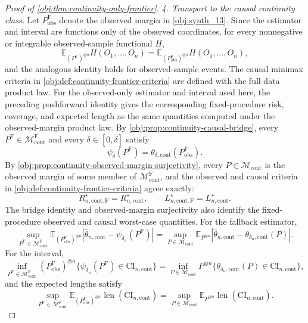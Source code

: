 \begin{proof}[Proof of \cref{obj:thm:continuity-only-frontier}]
\emph{4. Transport to the causal continuity class.}
Let \(P^{\mathrm F}_{\mathrm{obs}}\) denote the observed margin in \cref{obj:synth_13}.  Since the estimator and interval are functions only of the observed coordinates,
for every nonnegative or integrable observed-sample functional \(H\),
\[
\mathbb E_{(P^{\mathrm F})^{\otimes n}}H(O_1,\ldots,O_n)
=
\mathbb E_{(P^{\mathrm F}_{\mathrm{obs}})^{\otimes n}}H(O_1,\ldots,O_n),
\]
and the analogous identity holds for observed-sample events.  The causal minimax criteria in
\cref{obj:def:continuity-frontier-criteria} are defined with the full-data product law.  For the observed-only estimator and interval used here, the preceding pushforward identity gives the corresponding fixed-procedure risk, coverage, and expected length as the same quantities computed under the observed-margin product law.  By \cref{obj:prop:continuity-causal-bridge}, every
\(P^{\mathrm F}\in\mathcal M_{\mathrm{cont}}^{\mathrm F}\) and every
\(\delta\in[0,\bar\delta]\) satisfy
\[
\psi_\delta(P^{\mathrm F})
=
\theta_{\delta,\mathrm{cont}}(P^{\mathrm F}_{\mathrm{obs}}).
\]
By \cref{obj:prop:continuity-observed-margin-surjectivity}, every
\(P\in\mathcal M_{\mathrm{cont}}\) is the observed margin of some member of
\(\mathcal M_{\mathrm{cont}}^{\mathrm F}\), and the observed and causal criteria in
\cref{obj:def:continuity-frontier-criteria} agree exactly:
\[
R_{n,\mathrm{cont},\mathrm F}^\star=R_{n,\mathrm{cont}}^\star,
\qquad
L_{n,\mathrm{cont},\mathrm F}^\star=L_{n,\mathrm{cont}}^\star .
\]
The bridge identity and observed-margin surjectivity also identify the fixed-procedure observed and causal worst-case quantities.  For the fallback estimator,
\[
\sup_{P^{\mathrm F}\in\mathcal M_{\mathrm{cont}}^{\mathrm F}}
\mathbb E_{(P^{\mathrm F}_{\mathrm{obs}})^{\otimes n}}
\left|\widehat\theta_{n,\mathrm{cont}}-\psi_{\delta_n}(P^{\mathrm F})\right|
=
\sup_{P\in\mathcal M_{\mathrm{cont}}}
\mathbb E_{P^{\otimes n}}
\left|\widehat\theta_{n,\mathrm{cont}}-\theta_{\delta_n,\mathrm{cont}}(P)\right|.
\]
For the interval,
\[
\inf_{P^{\mathrm F}\in\mathcal M_{\mathrm{cont}}^{\mathrm F}}
(P^{\mathrm F}_{\mathrm{obs}})^{\otimes n}
\{\psi_{\delta_n}(P^{\mathrm F})\in\mathrm{CI}_{n,\mathrm{cont}}\}
=
\inf_{P\in\mathcal M_{\mathrm{cont}}}
P^{\otimes n}
\{\theta_{\delta_n,\mathrm{cont}}(P)\in\mathrm{CI}_{n,\mathrm{cont}}\},
\]
and the expected lengths satisfy
\[
\sup_{P^{\mathrm F}\in\mathcal M_{\mathrm{cont}}^{\mathrm F}}
\mathbb E_{(P^{\mathrm F}_{\mathrm{obs}})^{\otimes n}}
\operatorname{len}(\mathrm{CI}_{n,\mathrm{cont}})
=
\sup_{P\in\mathcal M_{\mathrm{cont}}}
\mathbb E_{P^{\otimes n}}
\operatorname{len}(\mathrm{CI}_{n,\mathrm{cont}}).
\]


\end{proof}
